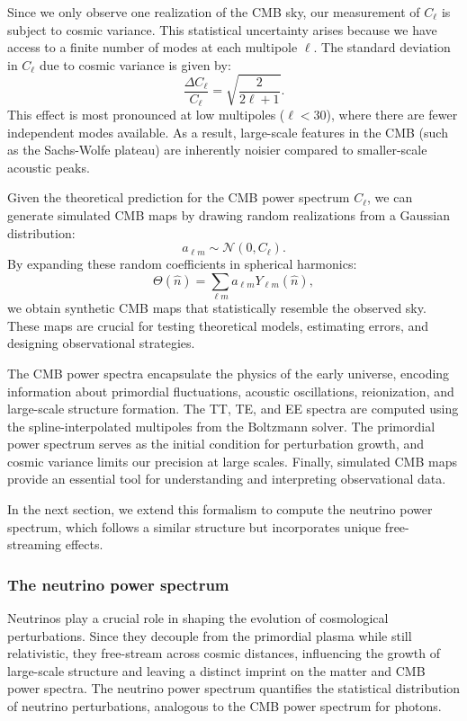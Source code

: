 \documentclass{aa}
\begin{document}
Since we only observe one realization of the CMB sky, our measurement of $C_\ell$ is subject to cosmic variance. This statistical uncertainty arises because we have access to a finite number of modes at each multipole $\ell$. The standard deviation in $C_\ell$ due to cosmic variance is given by:
\begin{equation}
\frac{\Delta C_\ell}{C_\ell} = \sqrt{\frac{2}{2\ell+1}}.
\end{equation}
This effect is most pronounced at low multipoles ($\ell < 30$), where there are fewer independent modes available. As a result, large-scale features in the CMB (such as the Sachs-Wolfe plateau) are inherently noisier compared to smaller-scale acoustic peaks.

Given the theoretical prediction for the CMB power spectrum $C_\ell$, we can generate simulated CMB maps by drawing random realizations from a Gaussian distribution:
\begin{equation}
a_{\ell m} \sim \mathcal{N}(0, C_\ell).
\end{equation}
By expanding these random coefficients in spherical harmonics:
\begin{equation}
\Theta(\hat{n}) = \sum_{\ell m} a_{\ell m} Y_{\ell m} (\hat{n}),
\end{equation}
we obtain synthetic CMB maps that statistically resemble the observed sky. These maps are crucial for testing theoretical models, estimating errors, and designing observational strategies. 

The CMB power spectra encapsulate the physics of the early universe, encoding information about primordial fluctuations, acoustic oscillations, reionization, and large-scale structure formation. The TT, TE, and EE spectra are computed using the spline-interpolated multipoles from the Boltzmann solver. The primordial power spectrum serves as the initial condition for perturbation growth, and cosmic variance limits our precision at large scales. Finally, simulated CMB maps provide an essential tool for understanding and interpreting observational data.  

In the next section, we extend this formalism to compute the neutrino power spectrum, which follows a similar structure but incorporates unique free-streaming effects.
\color{black}






\subsubsection{The neutrino power spectrum}
\color{Plum}
Neutrinos play a crucial role in shaping the evolution of cosmological perturbations. Since they decouple from the primordial plasma while still relativistic, they free-stream across cosmic distances, influencing the growth of large-scale structure and leaving a distinct imprint on the matter and CMB power spectra. The neutrino power spectrum quantifies the statistical distribution of neutrino perturbations, analogous to the CMB power spectrum for photons.
\end{document}
